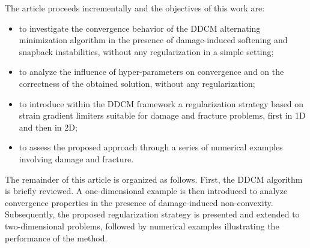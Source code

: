 \documentclass[10pt]{cas-sc}
\begin{document}
The article proceeds incrementally and the objectives of this work are:
\begin{itemize}
	\item to investigate the convergence behavior of the DDCM alternating minimization algorithm in the presence of damage-induced softening and snapback instabilities, without any regularization in a simple setting;
	\item to analyze the influence of hyper-parameters on convergence and on the correctness of the obtained solution, without any regularization;
	\item to introduce within the DDCM framework a regularization strategy based on strain gradient limiters suitable for damage and fracture problems, first in 1D and then in 2D;
	\item to assess the proposed approach through a series of numerical examples involving damage and fracture.
\end{itemize}

The remainder of this article is organized as follows. First, the DDCM algorithm is briefly reviewed. A one-dimensional example is then introduced to analyze convergence properties in the presence of damage-induced non-convexity. Subsequently, the proposed regularization strategy is presented and extended to two-dimensional problems, followed by numerical examples illustrating the performance of the method.
\end{document}
